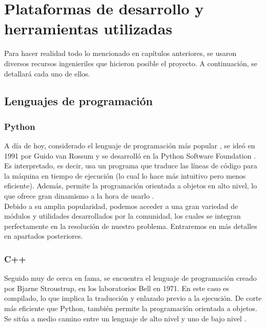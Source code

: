 \chapter{Plataformas de desarrollo y herramientas utilizadas}
\label{cap:capitulo3}

Para hacer realidad todo lo mencionado en capítulos anteriores, se usaron diversos recursos ingenieriles que hicieron posible el proyecto. A continuación, se detallará cada uno de ellos.

\section{Lenguajes de programación}
\label{sec:lenguajes_programacion}

\subsection{Python}
\label{subsec:python}

A día de hoy, considerado el lenguaje de programación más popular \cite{tiobe}, se ideó en 1991 por Guido van Rossum y se desarrolló en la Python Software Foundation \cite{python-history}. Es interpretado, es decir, usa un programa que traduce las líneas de código para la máquina en tiempo de ejecución (lo cual lo hace más intuitivo pero menos eficiente). Además, permite la programación orientada a objetos en alto nivel, lo que ofrece gran dinamismo a la hora de usarlo \cite{python-def} \cite{compiled-vs-interpreted}.\\

Debido a su amplia popularidad, podemos acceder a una gran variedad de módulos y utilidades desarrollados por la comunidad, los cuales se integran perfectamente en la resolución de nuestro problema. Entraremos en más detalles en apartados posteriores.\\

\subsection{C++}
\label{subsec:cplusplus}

Seguido muy de cerca en fama, se encuentra el lenguaje de programación creado por Bjarne Stroustrup, en los laboratorios Bell en 1971. En este caso es compilado, lo que implica la traducción y enlazado previo a la ejecución. De corte más eficiente que Python, también permite la programación orientada a objetos. Se sitúa a medio camino entre un lenguaje de alto nivel y uno de bajo nivel \cite{c-history}.\\

